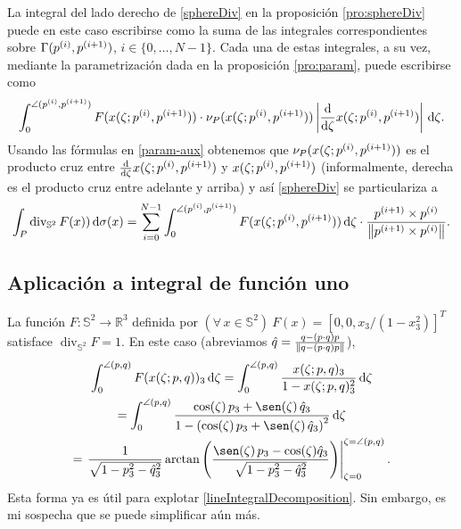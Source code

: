 \documentclass[reqno]{amsart}
\newcommand{\dd}[1][y]{\if#1y\,\fi{\mathrm d}} %
\newcommand{\norm}[2][y]{\if#1y\left\fi\lVert#2\if#1y\right\fi\rVert} %
\newcommand{\abs}[2][y]{\if#1y\left\fi\lvert#2\if#1y\right\fi\rvert} %
\newcommand{\psp}[1]{\sp{(#1)}} %
\begin{document}
La integral del lado derecho de \eqref{sphereDiv} en la proposición \ref{pro:sphereDiv} puede en este caso escribirse como la suma de las integrales correspondientes sobre $\Gamma(p\psp{i}, p\psp{i+1})$, $i \in \{0, \dotsc, N-1\}$.
Cada una de estas integrales, a su vez, mediante la parametrización dada en la proposición \ref{pro:param}, puede escribirse como
%
\begin{equation*}
\int_0^{\angle(p\psp{i}, p\psp{i+1})} F(x(\zeta;p\psp{i},p\psp{i+1})) \cdot \nu_P(x(\zeta;p\psp{i},p\psp{i+1})) \abs{\frac{\mathrm{d}}{\mathrm{d}\zeta} x(\zeta;p\psp{i},p\psp{i+1})} \dd \zeta.
\end{equation*}
%
Usando las fórmulas en \eqref{param-aux} obtenemos que $\nu_P(x(\zeta;p\psp{i},p\psp{i+1}))$ es el producto cruz entre $\frac{\mathrm{d}}{\mathrm{d}\zeta} x(\zeta;p\psp{i},p\psp{i+1})$ y $x(\zeta;p\psp{i},p\psp{i+1})$ (informalmente, derecha es el producto cruz entre adelante y arriba) y así \eqref{sphereDiv} se particulariza a
%
\begin{equation}\label{lineIntegralDecomposition}
\int_P \operatorname{div}_{\mathbb{S}^2} F(x)) \dd\sigma(x)
= \sum_{i=0}^{N-1} \int_0^{\angle(p\psp{i},p\psp{i+1})} F(x(\zeta;p\psp{i},p\psp{i+1})) \dd \zeta \cdot \frac{p\psp{i+1} \times p\psp{i}}{\norm{p\psp{i+1} \times p\psp{i}}}.
\end{equation}
%


\subsection{Aplicación a integral de función uno}

La función $F \colon \mathbb{S}^2 \to \mathbb{R}^3$ definida por $(\forall\,x\in\mathbb{S}^2)\ F(x) = [0, 0, x_3/(1-x_3^2)]^T$ satisface $\operatorname{div}_{\mathbb{S}^2} F = 1$.
En este caso (abreviamos $\hat q = \frac{q - (p\cdot q)p}{\norm{q - (p\cdot q)p}}$),
%
\begin{multline}\label{aux-1}
\int_0^{\angle(p,q)} F(x(\zeta;p,q))_3 \dd \zeta
= \int_0^{\angle(p,q)} \frac{x(\zeta;p,q)_3}{1-x(\zeta;p,q)_3^2} \dd\zeta\\
= \int_0^{\angle(p,q)} \frac{\cos(\zeta) \, p_3 + \sen(\zeta) \, \hat q_3}{1 - \left(\cos(\zeta) \, p_3 + \sen(\zeta) \, \hat q_3\right)^2} \dd \zeta\\
= \left. \frac{1}{\sqrt{1 - p_3^2 - \hat q_3^2}} \arctan\left( \frac{\sen(\zeta) \, p_3 - \cos(\zeta) \hat q_3}{\sqrt{1 - p_3^2 - \hat q_3^2}} \right) \right|_{\zeta=0}^{\zeta=\angle(p,q)}.
\end{multline}
%
Esta forma ya es útil para explotar \eqref{lineIntegralDecomposition}.
Sin embargo, es mi sospecha que se puede simplificar aún más.
\end{document}
